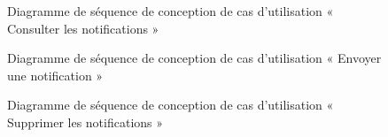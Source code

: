 \begin{figure}[H]
  \centering
  \caption{Diagramme de séquence de conception de cas d'utilisation « Consulter les notifications »}
  \label{fig:sequence_conception_lister_notification}
\end{figure}

\begin{figure}[H]
  \centering
  \caption{Diagramme de séquence de conception de cas d'utilisation « Envoyer une notification »}
  \label{fig:sequence_conception_send_notification}
\end{figure}

\begin{figure}[H]
  \centering
  \caption{Diagramme de séquence de conception de cas d'utilisation « Supprimer les notifications »}
  \label{fig:sequence_conception_delete_notification}
\end{figure}


